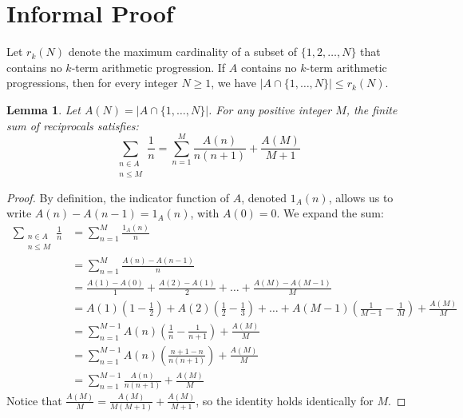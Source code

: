 \documentclass[11pt, a4paper]{article}
\newtheorem{lemma}[theorem]{Lemma}
\begin{document}
\section{Informal Proof}
Let $r_k(N)$ denote the maximum cardinality of a subset of $\{1, 2, \dots, N\}$ that contains no $k$-term arithmetic progression. If $A$ contains no $k$-term arithmetic progressions, then for every integer $N \ge 1$, we have $|A \cap \{1, \dots, N\}| \le r_k(N)$.

\begin{lemma}
Let $A(N) = |A \cap \{1, \dots, N\}|$. For any positive integer $M$, the finite sum of reciprocals satisfies:
$$ \sum_{\substack{n \in A \\ n \le M}} \frac{1}{n} = \sum_{n=1}^M \frac{A(n)}{n(n+1)} + \frac{A(M)}{M+1} $$
\end{lemma}
\begin{proof}
By definition, the indicator function of $A$, denoted $1_A(n)$, allows us to write $A(n) - A(n-1) = 1_A(n)$, with $A(0)=0$. We expand the sum:
\begin{align*}
\sum_{\substack{n \in A \\ n \le M}} \frac{1}{n} &= \sum_{n=1}^M \frac{1_A(n)}{n} \\
&= \sum_{n=1}^M \frac{A(n) - A(n-1)}{n} \\
&= \frac{A(1) - A(0)}{1} + \frac{A(2) - A(1)}{2} + \dots + \frac{A(M) - A(M-1)}{M} \\
&= A(1)\left(1 - \frac{1}{2}\right) + A(2)\left(\frac{1}{2} - \frac{1}{3}\right) + \dots + A(M-1)\left(\frac{1}{M-1} - \frac{1}{M}\right) + \frac{A(M)}{M} \\
&= \sum_{n=1}^{M-1} A(n) \left( \frac{1}{n} - \frac{1}{n+1} \right) + \frac{A(M)}{M} \\
&= \sum_{n=1}^{M-1} A(n) \left( \frac{n+1 - n}{n(n+1)} \right) + \frac{A(M)}{M} \\
&= \sum_{n=1}^{M-1} \frac{A(n)}{n(n+1)} + \frac{A(M)}{M}
\end{align*}
Notice that $\frac{A(M)}{M} = \frac{A(M)}{M(M+1)} + \frac{A(M)}{M+1}$, so the identity holds identically for $M$.
\end{proof}
\end{document}
